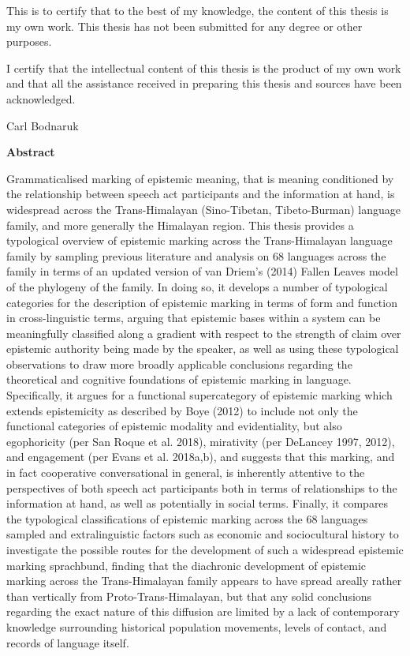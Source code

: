 \begin{center}
This is to certify that to the best of my knowledge, the content of this thesis is my own work. This thesis has not been submitted for any degree or other purposes.

I certify that the intellectual content of this thesis is the product of my own work and that all the assistance received in preparing this thesis and sources have been acknowledged.

\vspace{3cm}
Carl Bodnaruk

\end{center}
\newpage
\begin{center}
    \large
    \textbf{Abstract}
\end{center}
Grammaticalised marking of epistemic meaning, that is meaning conditioned by the relationship between speech act participants and the information at hand, is widespread across the Trans-Himalayan (Sino-Tibetan, Tibeto-Burman) language family, and more generally the Himalayan region. This thesis provides a typological overview of epistemic marking across the Trans-Himalayan language family by sampling previous literature and analysis on 68 languages across the family in terms of an updated version of van Driem's (2014) Fallen Leaves model of the phylogeny of the family. In doing so, it develops a number of typological categories for the description of epistemic marking in terms of form and function in cross-linguistic terms, arguing that epistemic bases within a system can be meaningfully classified along a gradient with respect to the strength of claim over epistemic authority being made by the speaker, as well as using these typological observations to draw more broadly applicable conclusions regarding the theoretical and cognitive foundations of epistemic marking in language. Specifically, it argues for a functional supercategory of epistemic marking which extends epistemicity as described by Boye (2012) to include not only the functional categories of epistemic modality and evidentiality, but also egophoricity (per San Roque et al. 2018), mirativity (per DeLancey 1997, 2012), and engagement (per Evans et al. 2018a,b), and suggests that this marking, and in fact cooperative conversational in general, is inherently attentive to the perspectives of both speech act participants both in terms of relationships to the information at hand, as well as potentially in social terms. Finally, it compares the typological classifications of epistemic marking across the 68 languages sampled and extralinguistic factors such as economic and sociocultural history to investigate the possible routes for the development of such a widespread epistemic marking sprachbund, finding that the diachronic development of epistemic marking across the Trans-Himalayan family appears to have spread areally rather than vertically from Proto-Trans-Himalayan, but that any solid conclusions regarding the exact nature of this diffusion are limited by a lack of contemporary knowledge surrounding historical population movements, levels of contact, and records of language itself.
